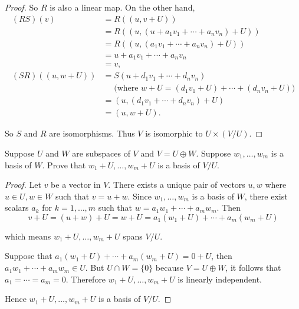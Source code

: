 \begin{proof}
    So $R$ is also a linear map. On the other hand,
    \begin{align*}
        (RS)(v)          & = R((u, v + U))                                                                  \\
                         & = R((u, (u + a_{1}v_{1} + \cdots + a_{n}v_{n}) + U))                             \\
                         & = R((u, (a_{1}v_{1} + \cdots + a_{n}v_{n}) + U))                                 \\
                         & = u + a_{1}v_{1} + \cdots + a_{n}v_{n}                                           \\
                         & = v,                                                                             \\
        (SR)((u, w + U)) & = S(u + d_{1}v_{1} + \cdots + d_{n}v_{n})                                        \\
                         & \phantom{=}\text{(where $w + U = (d_{1}v_{1} + U) + \cdots + (d_{n}v_{n} + U)$)} \\
                         & = (u, (d_{1}v_{1} + \cdots + d_{n}v_{n}) + U)                                    \\
                         & = (u, w + U).
    \end{align*}

    So $S$ and $R$ are isomorphisms. Thus $V$ is isomorphic to $U\times (V/U)$.
\end{proof}
\newpage

\begin{exercise}
    Suppose $U$ and $W$ are subspaces of $V$ and $V = U \oplus W$. Suppose $w_{1} , \ldots, w_{m}$ is a basis of $W$. Prove that $w_{1} + U, \ldots, w_{m} + U$ is a basis of $V/U$.
\end{exercise}

\begin{proof}
    Let $v$ be a vector in $V$. There exists a unique pair of vectors $u, w$ where $u\in U, w\in W$ such that $v = u + w$. Since $w_{1}, \ldots, w_{m}$ is a basis of $W$, there exist scalars $a_{k}$ for $k = 1,\ldots, m$ such that $w = a_{1}w_{1} + \cdots + a_{m}w_{m}$. Then
    \[
        v + U = (u + w) + U = w + U = a_{1}(w_{1} + U) + \cdots + a_{m}(w_{m} + U)
    \]

    which means $w_{1} + U, \ldots, w_{m} + U$ spans $V/U$.

    Suppose that $a_{1}(w_{1} + U) + \cdots + a_{m}(w_{m} + U) = 0 + U$, then $a_{1}w_{1} + \cdots + a_{m}w_{m}\in U$. But $U\cap W = \{0\}$ because $V = U\oplus W$, it follows that $a_{1} = \cdots = a_{m} = 0$. Therefore $w_{1} + U, \ldots, w_{m} + U$ is linearly independent.

    Hence $w_{1} + U, \ldots, w_{m} + U$ is a basis of $V/U$.
\end{proof}
\newpage

